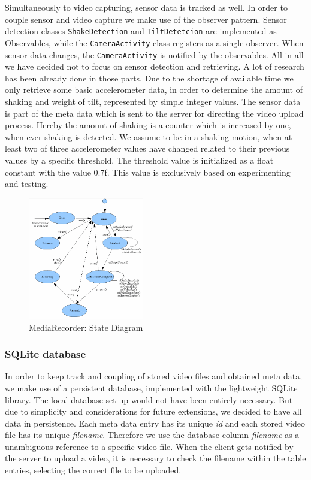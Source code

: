 \documentclass[conference]{IEEEtran}
\begin{document}
Simultaneously to video capturing, sensor data is tracked as well.
In order to couple sensor and video capture we make use of the observer pattern.
Sensor detection classes \texttt{ShakeDetection} and \texttt{TiltDetetcion} are implemented as Observables,
while the \texttt{CameraActivity} class registers as a single observer. 
When sensor data changes, the \texttt{CameraActivity} is notified by the observables.
All in all we have decided not to focus on sensor detection and retrieving.
A lot of research has been already done in those parts. Due to the shortage of available time we only retrieve 
some basic accelerometer data, in order to determine the amount of shaking and weight of tilt, 
represented by simple integer values.
The sensor data is part of the meta data which is sent to the server for directing the video upload process.
Hereby the amount of shaking is a counter which is increased by one, when ever shaking is detected.
We assume to be in a shaking motion, when at least two of three accelerometer values have changed related
to their previous values by a specific threshold.
The threshold value is initialized as a float constant with the value 0.7f. This value is exclusively based on experimenting and testing.

\begin{figure}[!t]
	\centering
	\includegraphics[width=0.45\textwidth]{mediarecorder.jpg}
	\caption{MediaRecorder: State Diagram}
	\label{fig:mediarecorder}
\end{figure}

\subsubsection{SQLite database}
In order to keep track and coupling of stored video files and obtained meta data, we make use of a persistent database,
implemented with the lightweight SQLite library.
The local database set up would not have been entirely necessary. 
But due to simplicity and considerations for future extensions, we decided to have all data in persistence.
Each meta data entry has its unique \textsl{id} and each stored video file has its unique \textsl{filename}.
Therefore we use the database column \textsl{filename} as a unambiguous reference to a specific video file.
When the client gets notified by the server to upload a video, it is necessary to check the filename within 
the table entries, selecting the correct file to be uploaded.
\end{document}
